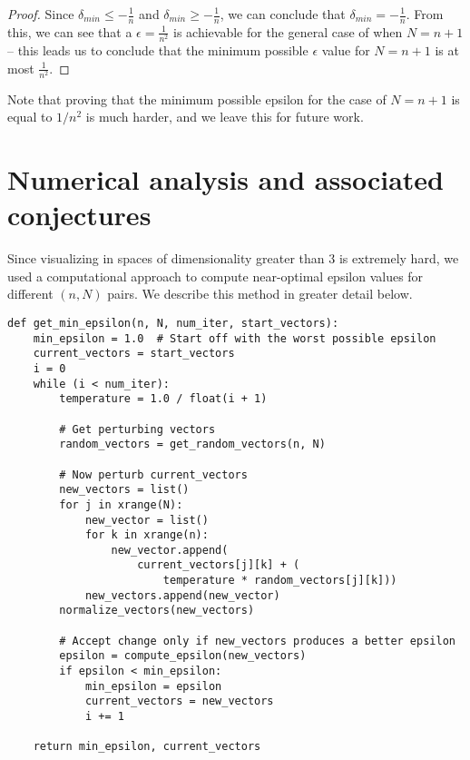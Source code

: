 \documentclass[11pt,letterpaper,twoside,english]{article}
\theoremstyle{theorem}
\theoremstyle{remark}
\begin{document}
\begin{proof}
Since $\delta_{min} \le -\frac{1}{n}$ and $\delta_{min} \ge -\frac{1}{n}$, we can conclude that $\delta_{min}=-\frac{1}{n}$. From this, we can see that a $\epsilon = \frac{1}{n^2}$ is achievable for the general case of when $N=n+1$ -- this leads us to conclude that the minimum possible $\epsilon$ value for $N=n+1$ is at most $\frac{1}{n^2}$.
\end{proof}

Note that proving that the minimum possible epsilon for the case of $N = n+1$ is equal to $1/n^2$ is much harder, and we leave this for future work.

\section{Numerical analysis and associated conjectures}

Since visualizing in spaces of dimensionality greater than $3$ is extremely hard, we used a computational approach to compute near-optimal epsilon values for different $(n, N)$ pairs. We describe this method in greater detail below.

\begin{lstlisting}
def get_min_epsilon(n, N, num_iter, start_vectors):
    min_epsilon = 1.0  # Start off with the worst possible epsilon
    current_vectors = start_vectors
    i = 0
    while (i < num_iter):
        temperature = 1.0 / float(i + 1)

        # Get perturbing vectors
        random_vectors = get_random_vectors(n, N)

        # Now perturb current_vectors
        new_vectors = list()
        for j in xrange(N):
            new_vector = list()
            for k in xrange(n):
                new_vector.append(
                    current_vectors[j][k] + (
                    	temperature * random_vectors[j][k]))
            new_vectors.append(new_vector)
        normalize_vectors(new_vectors)
        
        # Accept change only if new_vectors produces a better epsilon
        epsilon = compute_epsilon(new_vectors)
        if epsilon < min_epsilon:
            min_epsilon = epsilon
            current_vectors = new_vectors
            i += 1

    return min_epsilon, current_vectors
\end{lstlisting}
\end{document}
